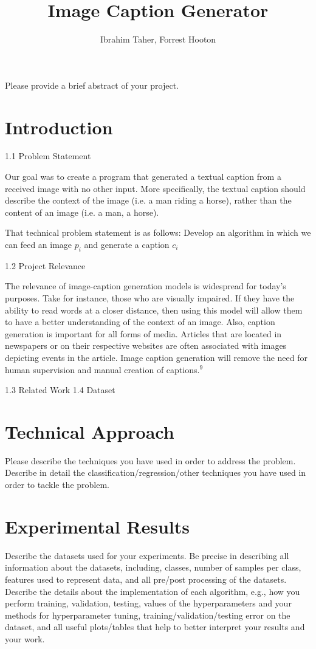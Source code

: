 \documentclass[11.5pt]{article}
\title{Image Caption Generator}
\author{Ibrahim Taher, Forrest Hooton}
\date{}
\begin{document}
\maketitle

\abstract
Please provide a brief abstract of your project.

\vspace{2mm}
\section{Introduction}

1.1 Problem Statement

Our goal was to create a program that generated a  textual caption from a received image with no other input. More specifically, the textual caption should describe the context of the image (i.e. a man riding a horse), rather than the content of an image (i.e. a man, a horse).

That technical problem statement is as follows:
Develop an algorithm in which we can feed an image $p_i$ and generate a caption $c_i$

1.2 Project Relevance

The relevance of image-caption generation models is widespread for today's purposes. Take for instance, those who are visually impaired. If they have the ability to read words at a closer distance, then using this model will allow them to have a better understanding of the context of an image. Also, caption generation is important for all forms of media. Articles that are located in newspapers or on their respective websites are often associated with images depicting events in the article. Image caption generation will remove the need for human supervision and manual creation of captions.$^9$

1.3 Related Work
1.4 Dataset

\section{Technical Approach}
Please describe the techniques you have used in order to address the problem. Describe in detail the classification/regression/other techniques you have used in order to tackle the problem.

\section{Experimental Results}
Describe the datasets used for your experiments. Be precise in describing all information about the datasets, including, classes, number of samples per class, features used to represent data, and all pre/post processing of the datasets.\\
Describe the details about the implementation of each algorithm, e.g., how you perform training, validation, testing, values of the hyperparameters and your methods for hyperparameter tuning, training/validation/testing error on the dataset, and all useful plots/tables that help to better interpret your results and your work.
\end{document}
